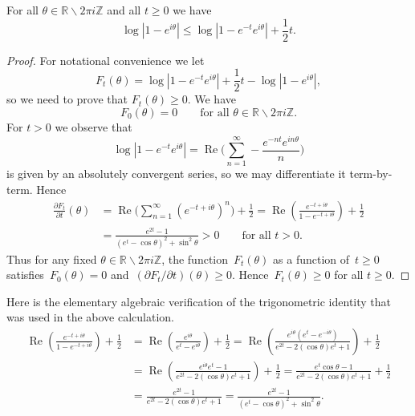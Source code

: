 \begin{lemma}
\label{lemma:Gttheta}
For all $\theta\in{\mathbb{R}}{\smallsetminus}2\pi i{\mathbb{Z}}$ and all $t\ge0$
we have
\[
  \log|1-e^{i\theta}| \le \log|1-e^{-t}e^{i\theta}| + \frac12t.
\]
\end{lemma}
\begin{proof}
For notational convenience we let
\[
  F_t(\theta) =
  \log|1-e^{-t}e^{i\theta}| + \frac12t - \log|1-e^{i\theta}|,
\]
so we need to prove that $F_t(\theta)\ge0$.  We have
\[
  F_0(\theta)=0
  \qquad\text{for all $\theta\in{\mathbb{R}}{\smallsetminus}2\pi i{\mathbb{Z}}$.}
\]
For $t>0$ we observe that
\[
  \log|1-e^{-t}e^{i\theta}|
   = {\operatorname{Re}}\biggl(\sum_{n=1}^\infty -\frac{e^{-nt}e^{in\theta}}{n}\biggr)
\]
is given by an absolutely convergent series, so we may differentiate it
term-by-term. Hence
\begin{align*}
  \frac{\partial F_t}{\partial t}(\theta)
  &= {\operatorname{Re}}\biggl(\sum_{n=1}^\infty (e^{-t+i\theta})^n\biggr) + \frac12 
  = {\operatorname{Re}}\left( \frac{e^{-t+i\theta}}{1-e^{-t+i\theta}}\right) + \frac12 \\
  &= \frac{e^{2t}-1}{(e^t-\cos\theta)^2+\sin^2\theta} 
   > 0 \qquad\text{for all $t>0$.}
\end{align*}
Thus for any fixed $\theta\in{\mathbb{R}}{\smallsetminus}2\pi i{\mathbb{Z}}$, the
function~$F_t(\theta)$ as a function of~$t\ge0$
satisfies~$F_0(\theta)=0$ and~$(\partial F_t/\partial t)(\theta)\ge
0$. Hence~$F_t(\theta)\ge0$ for all $t\ge0$. 
\end{proof}

{\tiny
Here is the elementary algebraic verification of the trigonometric
identity that was used in the above calculation.
\begin{align*}
  {\operatorname{Re}}\left( \frac{e^{-t+i\theta}}{1-e^{-t+i\theta}}\right) + \frac12 
  &= {\operatorname{Re}}\left(\frac{e^{i\theta}}{e^t-e^{i\theta}}\right) + \frac12  
  = {\operatorname{Re}}\left(\frac{e^{i\theta}(e^t-e^{-i\theta})}{e^{2t}-2(\cos\theta)e^t+1}\right)
          + \frac12 \\
  &= {\operatorname{Re}}\left(\frac{e^{i\theta}e^t-1}{e^{2t}-2(\cos\theta)e^t+1}\right)
          + \frac12 
  = \frac{e^t\cos\theta-1}{e^{2t}-2(\cos\theta)e^t+1}+\frac12 \\
  &= \frac{e^{2t}-1}{e^{2t}-2(\cos\theta)e^t+1} 
  = \frac{e^{2t}-1}{(e^t-\cos\theta)^2+\sin^2\theta}.
\end{align*}
}

